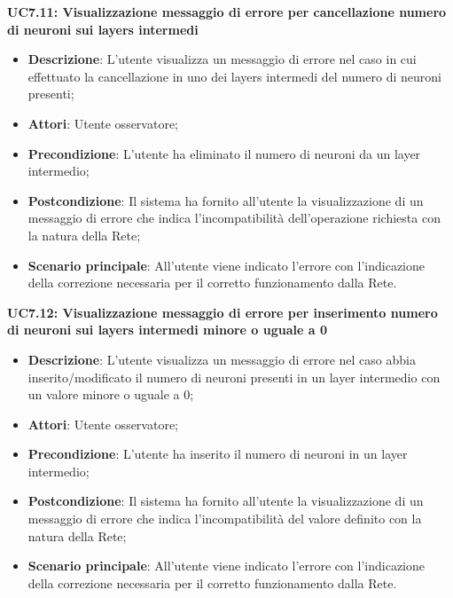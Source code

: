 \textbf{UC7.11: Visualizzazione messaggio di errore per cancellazione numero di neuroni sui layers intermedi}\mbox{}
\label{UC7.11: Visualizzazione messaggio di errore per cancellazione numero di neuroni sui layers intermedi}
\noindent
\begin{itemize}
\item \textbf{Descrizione}: L'utente visualizza un messaggio di errore nel caso in cui effettuato la cancellazione in uno dei layers intermedi del numero di neuroni presenti;
\item \textbf{Attori}: Utente osservatore;
\item \textbf{Precondizione}: L'utente ha eliminato il numero di neuroni da un layer intermedio;
\item \textbf{Postcondizione}: Il sistema ha fornito all'utente la visualizzazione di un messaggio di errore che indica l'incompatibilit\`a dell'operazione richiesta con la natura della Rete;
\item \textbf{Scenario principale}: All'utente viene indicato l'errore con l'indicazione della correzione necessaria per il corretto funzionamento dalla Rete.
\end{itemize}

\textbf{UC7.12: Visualizzazione messaggio di errore per inserimento numero di neuroni sui layers intermedi minore o uguale a 0}\mbox{}
\label{UC7.12: Visualizzazione messaggio di errore per inserimento numero di neuroni sui layers intermedi minore o uguale a 0}
\noindent
\begin{itemize}
\item \textbf{Descrizione}: L'utente visualizza un messaggio di errore nel caso abbia inserito/modificato il numero di neuroni presenti in un layer intermedio con un valore minore o uguale a 0;
\item \textbf{Attori}: Utente osservatore;
\item \textbf{Precondizione}: L'utente ha inserito il numero di neuroni in un layer intermedio;
\item \textbf{Postcondizione}: Il sistema ha fornito all'utente la visualizzazione di un messaggio di errore che indica l'incompatibilit\`a del valore definito con la natura della Rete;
\item \textbf{Scenario principale}: All'utente viene indicato l'errore con l'indicazione della correzione necessaria per il corretto funzionamento dalla Rete.
\end{itemize}


